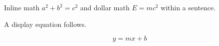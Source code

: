 Inline math \(a^2 + b^2 = c^2\) and dollar math $E = mc^2$ within a
sentence.

A display equation follows.

\[ y = m x + b \]
